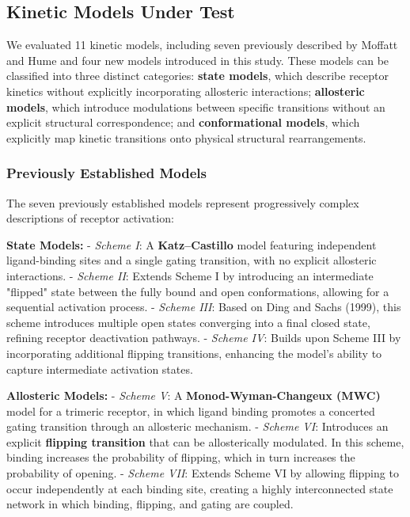 \documentclass[pdflatex,sn-mathphys-num]{sn-jnl}%
\theoremstyle{thmstyleone}%
\theoremstyle{thmstyletwo}%
\theoremstyle{thmstylethree}%
\begin{document}
\subsection{Kinetic Models Under Test}

We evaluated 11 kinetic models, including seven previously described by Moffatt and Hume \cite{Moffatt_hume} and four new models introduced in this study. These models can be classified into three distinct categories: \textbf{state models}, which describe receptor kinetics without explicitly incorporating allosteric interactions; \textbf{allosteric models}, which introduce modulations between specific transitions without an explicit structural correspondence; and \textbf{conformational models}, which explicitly map kinetic transitions onto physical structural rearrangements.

\subsubsection{Previously Established Models}

The seven previously established models represent progressively complex descriptions of receptor activation:

\textbf{State Models:}  
- \textit{Scheme I}: A \textbf{Katz–Castillo} model featuring independent ligand-binding sites and a single gating transition, with no explicit allosteric interactions.  
- \textit{Scheme II}: Extends Scheme I by introducing an intermediate "flipped" state between the fully bound and open conformations, allowing for a sequential activation process.  
- \textit{Scheme III}: Based on Ding and Sachs (1999), this scheme introduces multiple open states converging into a final closed state, refining receptor deactivation pathways.  
- \textit{Scheme IV}: Builds upon Scheme III by incorporating additional flipping transitions, enhancing the model’s ability to capture intermediate activation states.  

\textbf{Allosteric Models:}  
- \textit{Scheme V}: A \textbf{Monod-Wyman-Changeux (MWC)} model for a trimeric receptor, in which ligand binding promotes a concerted gating transition through an allosteric mechanism.  
- \textit{Scheme VI}: Introduces an explicit \textbf{flipping transition} that can be allosterically modulated. In this scheme, binding increases the probability of flipping, which in turn increases the probability of opening.  
- \textit{Scheme VII}: Extends Scheme VI by allowing flipping to occur independently at each binding site, creating a highly interconnected state network in which binding, flipping, and gating are coupled.  
\end{document}
